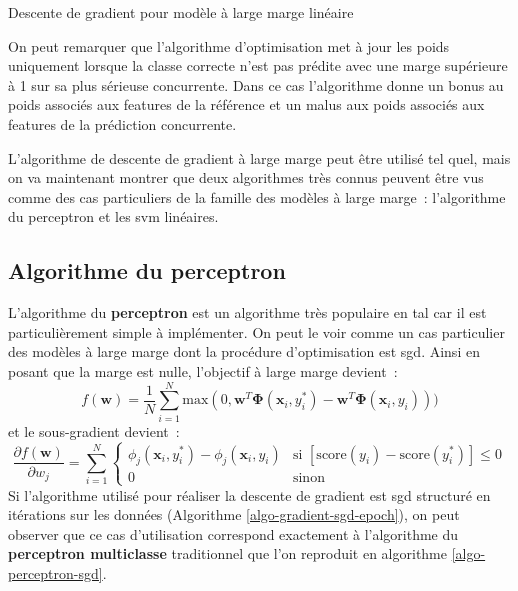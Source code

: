 \documentclass[11pt,openany]{book}
\newcommand{\ac}[1]{{\sc #1}} %
\newcommand{\kw}[1]{{\bf #1}} %
\begin{document}
\begin{algorithm}[htbp]
\caption{\label{algo-grad-LM}Descente de gradient pour modèle à large marge linéaire}
\end{algorithm}
On peut remarquer que l'algorithme d'optimisation met à jour les poids
uniquement lorsque la classe correcte n'est pas prédite avec une marge
supérieure à 1 sur sa plus sérieuse concurrente.
Dans ce cas l'algorithme donne un bonus au poids associés aux features
de la référence et un malus aux poids associés aux features de la
prédiction concurrente.

L'algorithme de descente de gradient à large marge peut être utilisé
tel quel, mais on va maintenant montrer que deux algorithmes très connus peuvent être
vus comme des cas particuliers de la famille des modèles à large
marge~: l'algorithme du perceptron et les \ac{svm} linéaires.


\subsection{Algorithme du perceptron}

L'algorithme du \kw{perceptron} est un algorithme très populaire en \ac{tal}
car il est particulièrement simple à implémenter. On peut le voir
comme un cas particulier des modèles à large marge dont la procédure
d'optimisation est \ac{sgd}. Ainsi en posant que la marge est nulle, l'objectif à
large marge devient~:
\begin{equation}
f(\mathbf{w}) = \frac{1}{N}\sum_{i=1}^N \text{max}(0,
\mathbf{w}^T\boldsymbol\Phi(\mathbf{x}_i,y^*_i) - \mathbf{w}^T\boldsymbol\Phi(\mathbf{x}_i,y_i) ))
\end{equation}
et le sous-gradient devient~:
\begin{equation}
\label{eq-perceptron-grad}
\frac{\partial f(\mathbf{w})}{\partial w_j} =  
\sum_{i=1}^N \left\{
\begin{array}{ll}
\phi_j(\mathbf{x}_{i},y^*_i) -\phi_j(\mathbf{x}_{i},y_i) &\text{si }
[ \text{score}(y_i) - \text{score}(y^*_i)  ]\leq 0\\
0&\text{sinon}
\end{array}\right.
\end{equation}
Si l'algorithme utilisé pour réaliser la descente de gradient est \ac{sgd}
structuré en itérations sur les données (Algorithme \ref{algo-gradient-sgd-epoch}),
on peut observer que ce cas d'utilisation correspond exactement
à l'algorithme du \kw{perceptron multiclasse} traditionnel que l'on
reproduit en algorithme \ref{algo-perceptron-sgd}.
\end{document}

